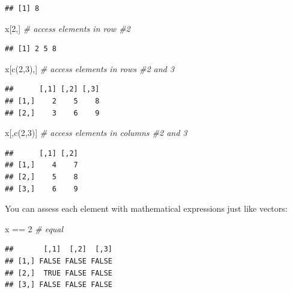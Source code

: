 \documentclass[
]{book}
\newenvironment{Shaded}{\begin{snugshade}}{\end{snugshade}}
\newcommand{\CommentTok}[1]{\textcolor[rgb]{0.56,0.35,0.01}{\textit{#1}}}
\newcommand{\DecValTok}[1]{\textcolor[rgb]{0.00,0.00,0.81}{#1}}
\newcommand{\FunctionTok}[1]{\textcolor[rgb]{0.00,0.00,0.00}{#1}}
\newcommand{\NormalTok}[1]{#1}
\newcommand{\SpecialCharTok}[1]{\textcolor[rgb]{0.00,0.00,0.00}{#1}}
\begin{document}
\begin{verbatim}
## [1] 8
\end{verbatim}

\begin{Shaded}
\begin{Highlighting}[]
\NormalTok{x[}\DecValTok{2}\NormalTok{,] }\CommentTok{\# access elements in row \#2}
\end{Highlighting}
\end{Shaded}

\begin{verbatim}
## [1] 2 5 8
\end{verbatim}

\begin{Shaded}
\begin{Highlighting}[]
\NormalTok{x[}\FunctionTok{c}\NormalTok{(}\DecValTok{2}\NormalTok{,}\DecValTok{3}\NormalTok{),] }\CommentTok{\# access elements in rows \#2 and 3}
\end{Highlighting}
\end{Shaded}

\begin{verbatim}
##      [,1] [,2] [,3]
## [1,]    2    5    8
## [2,]    3    6    9
\end{verbatim}

\begin{Shaded}
\begin{Highlighting}[]
\NormalTok{x[,}\FunctionTok{c}\NormalTok{(}\DecValTok{2}\NormalTok{,}\DecValTok{3}\NormalTok{)] }\CommentTok{\# access elements in columns \#2 and 3}
\end{Highlighting}
\end{Shaded}

\begin{verbatim}
##      [,1] [,2]
## [1,]    4    7
## [2,]    5    8
## [3,]    6    9
\end{verbatim}

You can assess each element with mathematical expressions just like vectors:

\begin{Shaded}
\begin{Highlighting}[]
\NormalTok{x }\SpecialCharTok{==} \DecValTok{2} \CommentTok{\# equal}
\end{Highlighting}
\end{Shaded}

\begin{verbatim}
##       [,1]  [,2]  [,3]
## [1,] FALSE FALSE FALSE
## [2,]  TRUE FALSE FALSE
## [3,] FALSE FALSE FALSE
\end{verbatim}
\end{document}
